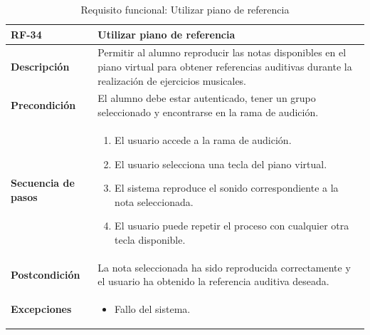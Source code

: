 \begin{table}[H]
\centering
\begin{tabularx}{\textwidth}{
|>{\centering\arraybackslash}l
|>{\centering\arraybackslash}X|}
\hline

\textbf{RF-34} & \textbf{Utilizar piano de referencia} \\ \hline

\textbf{Descripción} & Permitir al alumno reproducir las notas disponibles en el piano virtual para obtener referencias auditivas durante la realización de ejercicios musicales. \\ \hline

\textbf{Precondición} & El alumno debe estar autenticado, tener un grupo seleccionado y encontrarse en la rama de audición. \\ \hline

\textbf{Secuencia de pasos} &
\begin{enumerate}
\item El usuario accede a la rama de audición.
\item El usuario selecciona una tecla del piano virtual.
\item El sistema reproduce el sonido correspondiente a la nota seleccionada.
\item El usuario puede repetir el proceso con cualquier otra tecla disponible.
\end{enumerate} \\ \hline

\textbf{Postcondición} & La nota seleccionada ha sido reproducida correctamente y el usuario ha obtenido la referencia auditiva deseada. \\ \hline

\textbf{Excepciones} &
\begin{itemize}
\item Fallo del sistema.
\end{itemize} \\ \hline

\end{tabularx}
\caption{Requisito funcional: Utilizar piano de referencia}
\end{table}

